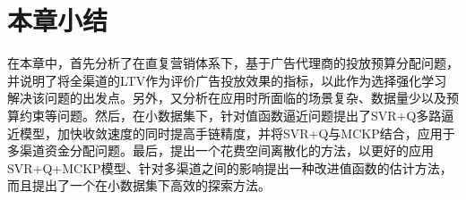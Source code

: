 



\section{本章小结}
在本章中，首先分析了在直复营销体系下，基于广告代理商的投放预算分配问题，并说明了将全渠道的LTV作为评价广告投放效果的指标，以此作为选择强化学习解决该问题的出发点。另外，又分析在应用时所面临的场景复杂、数据量少以及预算约束等问题。然后，在小数据集下，针对值函数逼近问题提出了SVR+Q多路逼近模型，加快收敛速度的同时提高手链精度，并将SVR+Q与MCKP结合，应用于多渠道资金分配问题。最后，提出一个花费空间离散化的方法，以更好的应用SVR+Q+MCKP模型、针对多渠道之间的影响提出一种改进值函数的估计方法，而且提出了一个在小数据集下高效的探索方法。


